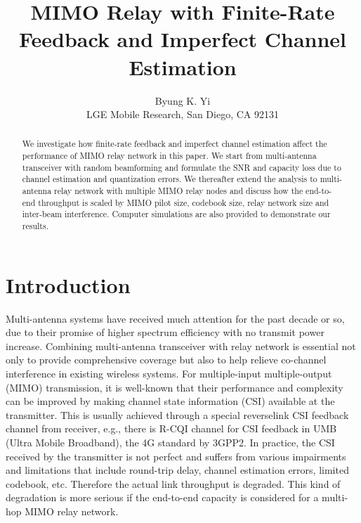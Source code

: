 \documentclass[10pt,fleqn, twocolumn]{IEEEtran}
\title{MIMO Relay with Finite-Rate Feedback and Imperfect Channel Estimation}
\author{Byung K. Yi\\LGE Mobile Research, San Diego, CA 92131}
\date{}
\begin{document}
\maketitle
\begin{abstract}\small
We investigate how finite-rate feedback and imperfect channel
estimation affect the performance of MIMO relay network in this
paper. We start from multi-antenna transceiver with random
beamforming and formulate the SNR and capacity loss due to channel
estimation and quantization errors. We thereafter extend the
analysis to multi-antenna relay network with multiple MIMO relay
nodes and discuss how the end-to-end throughput is scaled by MIMO
pilot size, codebook size, relay network size and inter-beam
interference. Computer simulations are also provided to
demonstrate our results.
\end{abstract}
\section{Introduction}
Multi-antenna systems have received much attention for the past
decade or so, due to their promise of higher spectrum efficiency
with no transmit power increase. Combining multi-antenna
transceiver with relay network is essential not only to provide
comprehensive coverage but also to help relieve co-channel
interference in existing wireless systems. For multiple-input
multiple-output (MIMO) transmission, it is well-known that their
performance and complexity can be improved by making channel state
information (CSI) available at the transmitter. This is usually
achieved through a special reverselink CSI feedback channel from
receiver, e.g., there is R-CQI channel for CSI feedback in UMB
(Ultra Mobile Broadband), the 4G standard by 3GPP2. In practice,
the CSI received by the transmitter is not perfect and suffers
from various impairments and limitations that include round-trip
delay, channel estimation errors, limited codebook, etc. Therefore
the actual link throughput is degraded. This kind of degradation
is more serious if the end-to-end capacity is considered for a
multi-hop MIMO relay network.
\end{document}

